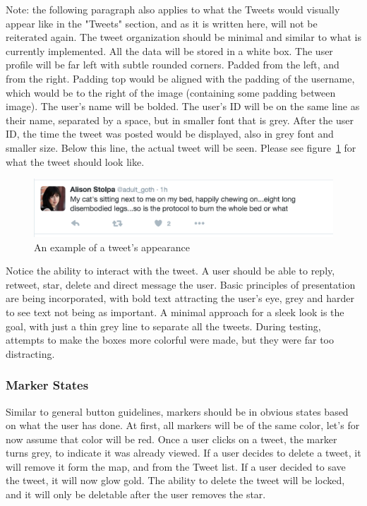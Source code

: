 \documentclass[11pt]{article}
\begin{document}
Note: the following paragraph also applies to what the Tweets would visually appear like in the "Tweets" section, and as it is written here, will not be reiterated again. The tweet organization should be minimal and similar to what is currently implemented. All the data will be stored in a white box. The user profile will be far left with subtle rounded corners. Padded from the left, and from the right. Padding top would be aligned with the padding of the username, which would be to the right of the image (containing some padding between image). The user's name will be bolded. The user's ID will be on the same line as their name, separated by a space, but in smaller font that is grey. After the user ID, the time the tweet was posted would be displayed, also in grey font and smaller size. Below this line, the actual tweet will be seen. Please see figure~\ref{fig:tweetExample} for what the tweet should look like.

\begin{figure}[H]
    \centering
    \includegraphics[width=20cm]{tweetExample}
    \caption{An example of a tweet's appearance}
    \label{fig:tweetExample}                
\end{figure}

Notice the ability to interact with the tweet. A user should be able to reply, retweet, star, delete and direct message the user. Basic principles of presentation are being incorporated, with bold text attracting the user's eye, grey and harder to see text not being as important. A minimal approach for a sleek look is the goal, with just a thin grey line to separate all the tweets. During testing, attempts to make the boxes more colorful were made, but they were far too distracting.

\subsubsection{Marker States}
Similar to general button guidelines, markers should be in obvious states based on what the user has done. At first, all markers will be of the same color, let's for now assume that color will be red. Once a user clicks on a tweet, the marker turns grey, to indicate it was already viewed. If a user decides to delete a tweet, it will remove it form the map, and from the Tweet list. If a user decided to save the tweet, it will now glow gold. The ability to delete the tweet will be locked, and it will only be deletable after the user removes the star.
\end{document}
